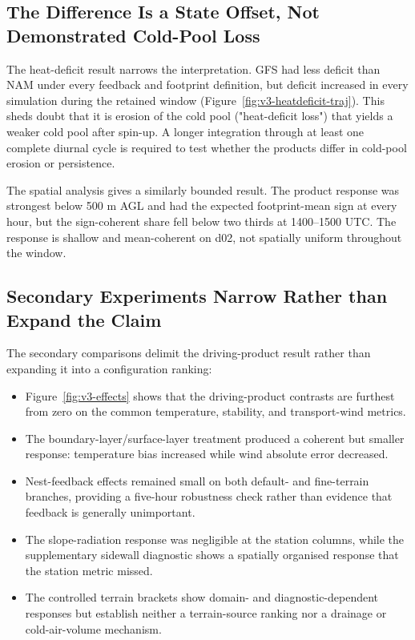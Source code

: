 \documentclass[air,article,submit,moreauthors]{Definitions/mdpi}
\begin{document}
\subsection{The Difference Is a State Offset, Not Demonstrated Cold-Pool Loss}
\label{sec:v3-disc-spatial}

The heat-deficit result narrows the interpretation.
GFS had less deficit than NAM under every feedback and footprint definition, but deficit increased in every simulation during the retained window (Figure~\ref{fig:v3-heatdeficit-traj}).
This sheds doubt that it is erosion of the cold pool ("heat-deficit loss") that yields a weaker cold pool after spin-up.
A longer integration through at least one complete diurnal cycle is required to test whether the products differ in cold-pool erosion or persistence.

The spatial analysis gives a similarly bounded result.
The product response was strongest below 500 m AGL and had the expected footprint-mean sign at every hour, but the sign-coherent share fell below two thirds at 1400--1500 UTC.
The response is shallow and mean-coherent on d02, not spatially uniform throughout the window.

\subsection{Secondary Experiments Narrow Rather than Expand the Claim}
\label{sec:v3-disc-process}

The secondary comparisons delimit the driving-product result rather than expanding it into a configuration ranking:

\begin{itemize}
  \item Figure~\ref{fig:v3-effects} shows that the driving-product contrasts are furthest from zero on the common temperature, stability, and transport-wind metrics.
  \item The boundary-layer/surface-layer treatment produced a coherent but smaller response: temperature bias increased while wind absolute error decreased.
  \item Nest-feedback effects remained small on both default- and fine-terrain branches, providing a five-hour robustness check rather than evidence that feedback is generally unimportant.
  \item The slope-radiation response was negligible at the station columns, while the supplementary sidewall diagnostic shows a spatially organised response that the station metric missed.
  \item The controlled terrain brackets show domain- and diagnostic-dependent responses but establish neither a terrain-source ranking nor a drainage or cold-air-volume mechanism.
\end{itemize}
\end{document}
